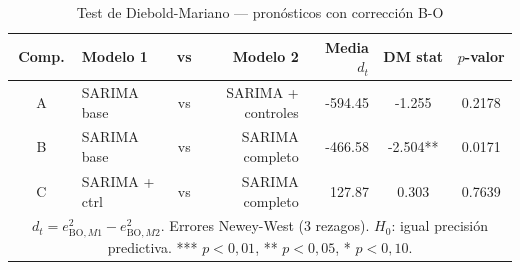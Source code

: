 \begin{table}[htbp]
\centering
\caption{Test de Diebold-Mariano --- pron\'{o}sticos con correcci\'{o}n B-O}
\label{tab:dm_base}
\begin{tabular}{clcrrcc}
\toprule
Comp. & Modelo 1 & vs & Modelo 2 & Media $d_t$ & DM stat & $p$-valor \\
\midrule
A & SARIMA base & vs & SARIMA + controles &  -594.45 & -1.255 & 0.2178 \\
B & SARIMA base & vs & SARIMA completo    &  -466.58 & -2.504** & 0.0171 \\
C & SARIMA + ctrl & vs & SARIMA completo  &   127.87 &  0.303 & 0.7639 \\
\bottomrule
\multicolumn{7}{p{0.88\textwidth}}{\footnotesize $d_t = e^2_{\text{BO},M1} - e^2_{\text{BO},M2}$. Errores Newey-West (3 rezagos). $H_0$: igual precisi\'{o}n predictiva. *** $p<0{,}01$, ** $p<0{,}05$, * $p<0{,}10$.}
\end{tabular}
\end{table}
